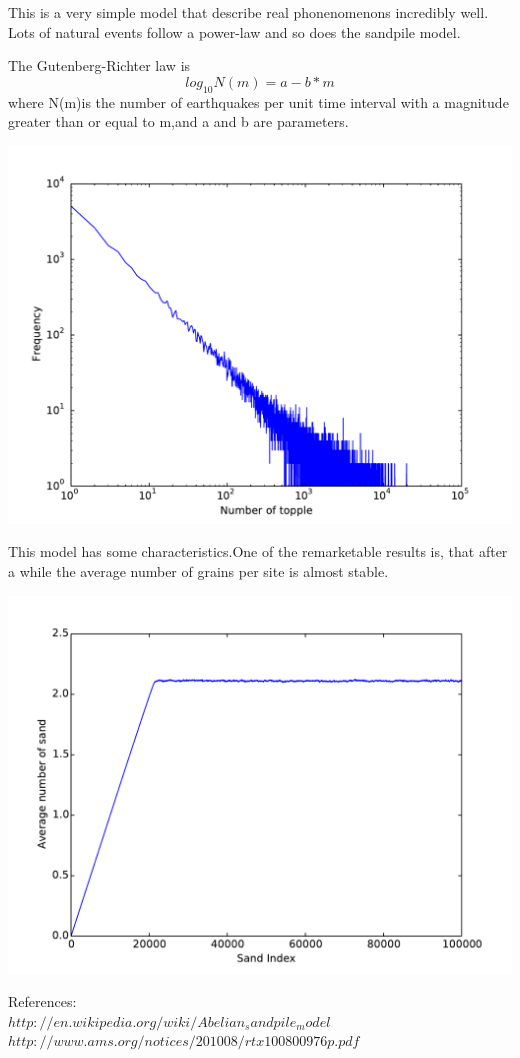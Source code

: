 \documentclass{beamer}
\begin{document}
\begin{frame}
This is a very simple model that describe real phonenomenons incredibly well. Lots of natural events follow a power-law and so does the sandpile model.
\end{frame}

\begin{frame}
The Gutenberg-Richter law is $$log_{10} N(m)=a-b*m$$ where N(m)is the number of earthquakes per unit time interval with a magnitude greater than or equal to m,and a and b are parameters. 
\end{frame}

\begin{frame}
\begin{center}
\includegraphics[scale = 0.5]{freq}
\end{center}
\end{frame}

\begin{frame}
This model has some characteristics.One of the remarketable results is, that after a while the average number of grains per site is almost stable.
\end{frame}

\begin{frame}
\begin{center}
\includegraphics[scale = 0.5]{avg}
\end{center}
\end{frame}

\begin{frame}
References:\\
$http://en.wikipedia.org/wiki/Abelian_sandpile_model$
$http://www.ams.org/notices/201008/rtx100800976p.pdf$
\end{frame}
\end{document}
